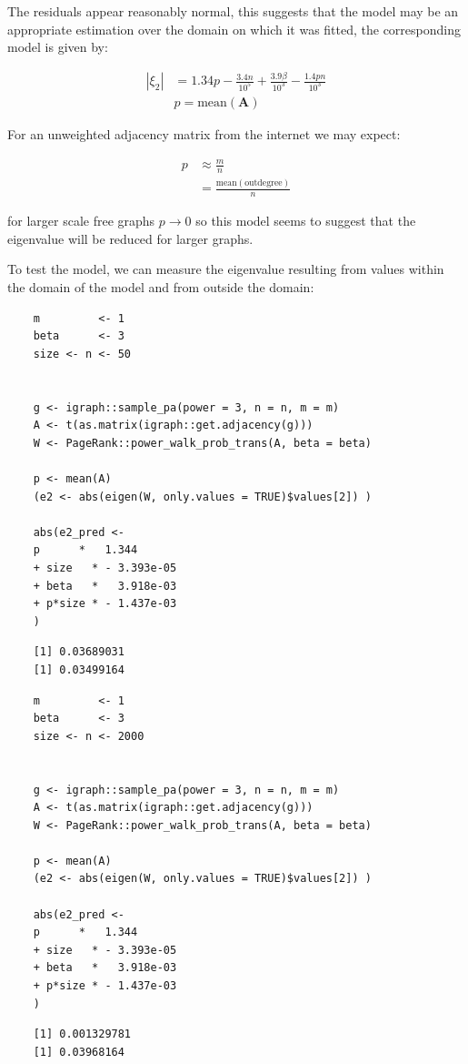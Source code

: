 \documentclass[11pt]{report}
\begin{document}
The residuals appear reasonably normal, this suggests that the model may be an appropriate estimation over the domain on which it was fitted, the corresponding model is given by:

\begin{align}
\left\lvert \xi_{2} \right\rvert &= 1.34 p -  \frac{3.4n}{10^{5}} + \frac{3.9\beta}{10^{3}} - \frac{1.4 p n}{10^{3}} \\
        &p = \mathrm{mean}\left( \mathbf{A}\right)
\end{align}

For an unweighted adjacency matrix from the internet we may expect:

\begin{align}
p &\approx \frac{m}{n} \\
  &= \frac{\mathrm{mean}\left(\mathrm{outdegree}\right)}{n}
\end{align}

for larger scale free graphs \(p \rightarrow 0\) so this model seems to suggest that the eigenvalue will be reduced for larger graphs.

To test the model, we can measure the eigenvalue resulting from values within the domain of the model and from outside the domain:

\begin{tcolorbox}
    \begin{verbatim}
    m         <- 1
    beta      <- 3
    size <- n <- 50


    g <- igraph::sample_pa(power = 3, n = n, m = m)
    A <- t(as.matrix(igraph::get.adjacency(g)))
    W <- PageRank::power_walk_prob_trans(A, beta = beta)

    p <- mean(A)
    (e2 <- abs(eigen(W, only.values = TRUE)$values[2]) )

    abs(e2_pred <-
    p      *   1.344
    + size   * - 3.393e-05
    + beta   *   3.918e-03
    + p*size * - 1.437e-03
    )
    \end{verbatim}
\tcblower
    \begin{verbatim}
    [1] 0.03689031
    [1] 0.03499164
    \end{verbatim}
\end{tcolorbox}


\begin{tcolorbox}
    \begin{verbatim}
    m         <- 1
    beta      <- 3
    size <- n <- 2000


    g <- igraph::sample_pa(power = 3, n = n, m = m)
    A <- t(as.matrix(igraph::get.adjacency(g)))
    W <- PageRank::power_walk_prob_trans(A, beta = beta)

    p <- mean(A)
    (e2 <- abs(eigen(W, only.values = TRUE)$values[2]) )

    abs(e2_pred <-
    p      *   1.344
    + size   * - 3.393e-05
    + beta   *   3.918e-03
    + p*size * - 1.437e-03
    )
    \end{verbatim}
\tcblower
    \begin{verbatim}
    [1] 0.001329781
    [1] 0.03968164
    \end{verbatim}
\end{tcolorbox}
\end{document}
